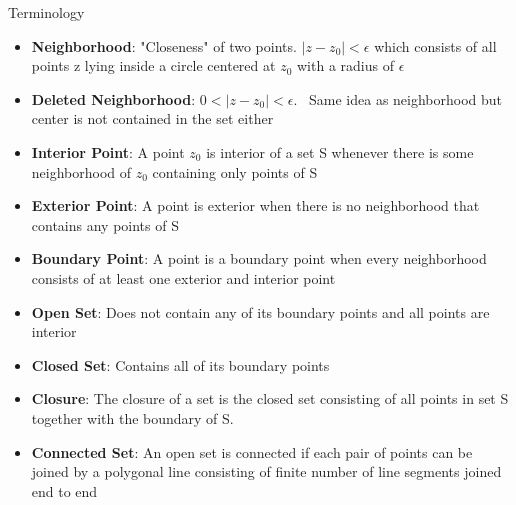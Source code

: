 \documentclass{article}
\begin{document}
   \begin{center}
            Terminology
    \end{center}
    \begin{itemize}
        \item \textbf{Neighborhood}: "Closeness" of two points. $|z-z_0| < \epsilon$ which consists
            of all points z lying inside a circle centered at $z_0$ with a radius of $\epsilon$
        \item \textbf{Deleted Neighborhood}: $0 < |z-z_0| < \epsilon$. \ Same idea as neighborhood but
            center is not contained in the set either
        \item \textbf{Interior Point}: A point $z_0$ is interior of a set S whenever there is some
            neighborhood of $z_0$ containing only points of S
        \item \textbf{Exterior Point}: A point is exterior when there is no neighborhood that contains
            any points of S
        \item \textbf{Boundary Point}: A point is a boundary point when every neighborhood consists of
            at least one exterior and interior point
        \item \textbf{Open Set}: Does not contain any of its boundary points and all points are interior
        \item \textbf{Closed Set}: Contains all of its boundary points
        \item \textbf{Closure}: The closure of a set is the closed set consisting of all points in set S
            together with the boundary of S.
        \item \textbf{Connected Set}: An open set is connected if each pair of points can be joined by a polygonal  line
            consisting of finite number of line segments joined end to end
    \end{itemize}
\end{document}
